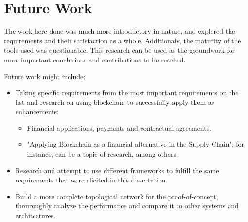 \section{Future Work}

The work here done was much more introductory in nature, and explored the requirements and their satisfaction as a whole. Additionaly, the maturity of the tools used was questionable. This research can be used as the groundwork for more important conclusions and contributions to be reached.

Future work might include:
\begin{itemize}
	\item Taking specific requirements from the most important requirements on the list and research on using blockchain to successfully apply them as enhancements:
	\begin{itemize}
		\item Financial applications, payments and contractual agreements.
		\item "Applying Blockchain as a financial alternative in the Supply Chain", for instance, can be a topic of research, among others.
	\end{itemize}
	\item Research and attempt to use different frameworks to fulfill the same requirements that were elicited in this dissertation.
    \item Build a more complete topological network for the proof-of-concept, thouroughly analyze the performance and compare it to other systems and architectures.
\end{itemize} 


%

